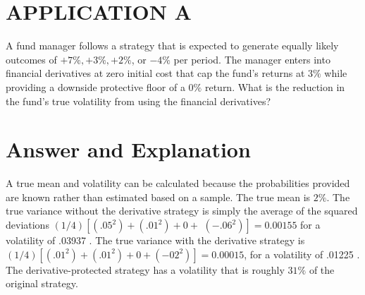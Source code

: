 \documentclass[11pt]{article}
\begin{document}
\section*{APPLICATION A}
A fund manager follows a strategy that is expected to generate equally likely outcomes of $+7 \%,+3 \%,+2 \%$, or $-4 \%$ per period. The manager enters into financial derivatives at zero initial cost that cap the fund's returns at $3 \%$ while providing a downside protective floor of a $0 \%$ return. What is the reduction in the fund's true volatility from using the financial derivatives?

\section*{Answer and Explanation}
A true mean and volatility can be calculated because the probabilities provided are known rather than estimated based on a sample. The true mean is $2 \%$. The true variance without the derivative strategy is simply the average of the squared deviations $(1 / 4)\left[\left(.05^{2}\right)+\left(.01^{2}\right)+0+\right.$ $\left.\left(-.06^{2}\right)\right]=0.00155$ for a volatility of .03937 . The true variance with the derivative strategy is $(1 / 4)\left[\left(.01^{2}\right)+\left(.01^{2}\right)+0+\left(-02^{2}\right)\right]=0.00015$, for a volatility of .01225 . The derivative-protected strategy has a volatility that is roughly $31 \%$ of the original strategy.
\end{document}
